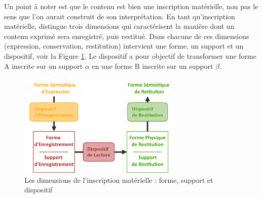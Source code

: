 Un point à noter est que le contenu est bien une inscription matérielle, non pas le sens que l'on aurait construit de son interprétation.
En tant qu'inscription matérielle, \citeauthor{bachimont:icc} distingue trois dimensions qui caractérisent la manière dont un contenu exprimé sera enregistré, puis restitué.
Dans chacune de ces dimensions (expression, conservation, restitution) intervient une forme, un support et un dispositif, voir la Figure \ref{img:inscriptions}.
Le dispositif a pour objectif de transformer une forme A inscrite sur un support $\alpha$ en une forme B inscrite sur un support $\beta$.

\begin{figure}[ht!]
\centering
\includegraphics[width=0.7\textwidth]{images/DimensionsInscriptions-v2.png}
\caption{Les dimensions de l'inscription matérielle : forme, support et dispositif}
\label{img:inscriptions}
\end{figure}


